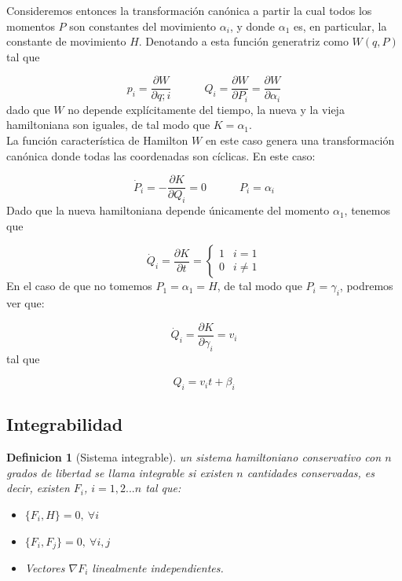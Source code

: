 \documentclass[12pt,a4paper]{article}
\numberwithin{equation}{section}
\numberwithin{figure}{section}
\newcommand{\parciales}[2]{\frac{\partial #1}{\partial #2}}
\newcommand{\tquad}{\quad \quad \quad}
\newtheorem{definition}{Definicion}[section]
\begin{document}
Consideremos entonces la transformación canónica a partir la cual todos los momentos $P$ son constantes del movimiento $\alpha_i$, y donde $\alpha_1$ es, en particular, la constante de movimiento $H$. Denotando a esta función generatriz como $W(q,P)$ tal que

\begin{equation}
p_i = \parciales{W}{q;i} \tquad Q_i = \parciales{W}{P_i}=\parciales{W}{\alpha_i}
\end{equation}
dado que $W$ no depende explícitamente del tiempo, la nueva y la vieja hamiltoniana son iguales, de tal modo que $K=\alpha_1$. \\

La función característica de Hamilton $W$ en este caso genera una transformación canónica donde todas las coordenadas son cíclicas. En este caso: 

\begin{equation}
\dot{P}_i = - \parciales{K}{Q_i} = 0 \tquad P_i = \alpha_i
\end{equation}
Dado que la nueva hamiltoniana depende únicamente del momento $\alpha_1$, tenemos que

\begin{equation}
\dot{Q}_i = \parciales{K}{t} = \left\lbrace \begin{array}{ll}
1 & i=1\\
0 & i \neq 1 
\end{array} \right.
\end{equation}
En el caso de que no tomemos $P_1=\alpha_1=H$, de tal modo que $P_i = \gamma_i$, podremos ver que:


\begin{equation}
\dot{Q}_i = \parciales{K}{\gamma_i} =v_i
\end{equation}
tal que

\begin{equation}
Q_i = v_i t + \beta_i 
\end{equation}


\subsection{Integrabilidad}

\begin{definition}[Sistema integrable]
un sistema hamiltoniano conservativo con $n$ grados de libertad se llama \textit{integrable} si existen $n$ cantidades conservadas, es decir, existen $F_i$, $i=1,2...n$ tal que:
\begin{itemize}
\item $\{ F_i , H \} = 0, \ \forall i$
\item $\{ F_i , F_j \} = 0, \ \forall i,j$
\item Vectores $\nabla F_i$ linealmente independientes.
\end{itemize}
\end{definition}
 
\end{document}
